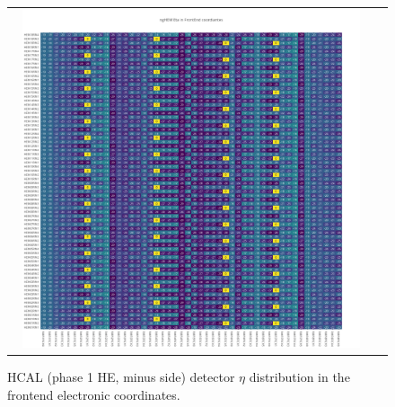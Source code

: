 \begin{figure}[htb]
 \begin{center}
  \begin{tabular}{cc}
   \includegraphics[angle=0,width=0.95\textwidth]{figures/appendix/ngHEM_Eta_in_FrontEnd.png}
  \end{tabular}
  \caption{HCAL (phase 1 HE, minus side) detector $\eta$ distribution in the frontend electronic coordinates.}
  \label{fig:lmapngHEMEtaFEC}
 \end{center}
\end{figure}
\clearpage

